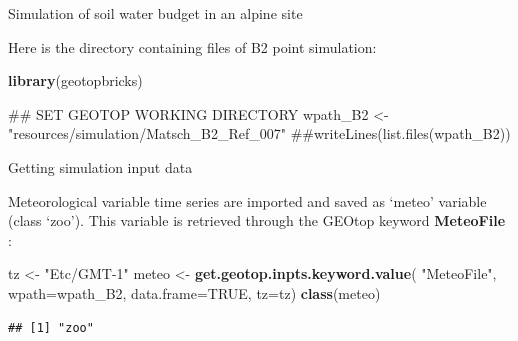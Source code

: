 \documentclass[ignorenonframetext,]{beamer}
\newenvironment{Shaded}{\begin{snugshade}}{\end{snugshade}}
\newcommand{\KeywordTok}[1]{\textcolor[rgb]{0.13,0.29,0.53}{\textbf{#1}}}
\newcommand{\DataTypeTok}[1]{\textcolor[rgb]{0.13,0.29,0.53}{#1}}
\newcommand{\StringTok}[1]{\textcolor[rgb]{0.31,0.60,0.02}{#1}}
\newcommand{\OtherTok}[1]{\textcolor[rgb]{0.56,0.35,0.01}{#1}}
\newcommand{\NormalTok}[1]{#1}
\begin{document}
\begin{frame}[fragile]{Simulation of soil water budget in an alpine
site}

Here is the directory containing files of B2 point simulation:

\begin{Shaded}
\begin{Highlighting}[]
\KeywordTok{library}\NormalTok{(geotopbricks) }

\NormalTok{## SET GEOTOP WORKING DIRECTORY}
\NormalTok{wpath_B2 <-}\StringTok{ "resources/simulation/Matsch_B2_Ref_007"} 
\NormalTok{##writeLines(list.files(wpath_B2))}
\end{Highlighting}
\end{Shaded}

\end{frame}

\begin{frame}[fragile]{Getting simulation input data}

Meteorological variable time series are imported and saved as `meteo'
variable (class `zoo'). This variable is retrieved through the GEOtop
keyword \textbf{MeteoFile} :

\begin{Shaded}
\begin{Highlighting}[]
\NormalTok{tz <-}\StringTok{ "Etc/GMT-1"}
\NormalTok{meteo <-}\StringTok{ }\KeywordTok{get.geotop.inpts.keyword.value}\NormalTok{(}
  \StringTok{"MeteoFile"}\NormalTok{,}
  \DataTypeTok{wpath=}\NormalTok{wpath_B2,}
  \DataTypeTok{data.frame=}\OtherTok{TRUE}\NormalTok{,}
  \DataTypeTok{tz=}\NormalTok{tz)}
\KeywordTok{class}\NormalTok{(meteo)}
\end{Highlighting}
\end{Shaded}

\begin{verbatim}
## [1] "zoo"
\end{verbatim}

\end{frame}
\end{document}
